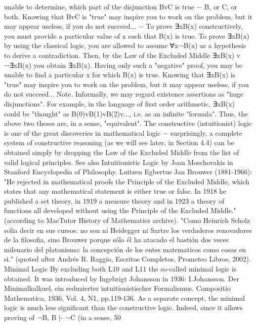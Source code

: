 unable to determine, which part of the disjunction BvC is true − B, or C, or both. Knowing that BvC is
"true" may inspire you to work on the problem, but it may appear useless, if you do not succeed...
− To prove ∃xB(x) constructively, you must provide a particular value of x such that B(x) is true. To
prove ∃xB(x) by using the classical logic, you are allowed to assume ∀x¬B(x) as a hypothesis to derive a
contradiction. Then, by the Law of the Excluded Middle ∃xB(x) v ¬∃xB(x) you obtain ∃xB(x). Having
only such a "negative" proof, you may be unable to find a particular x for which B(x) is true. Knowing
that ∃xB(x) is "true" may inspire you to work on the problem, but it may appear useless, if you do not
succeed...
Note. Informally, we may regard existence assertions as "huge disjunctions". For example, in the
language of first order arithmetic, ∃xB(x) could be "thought" as B(0)vB(1)vB(2)v..., i.e. as an infinite
"formula". Thus, the above two theses are, in a sense, "equivalent".
The constructive (intuitionist) logic is one of the great discoveries in mathematical logic − surprisingly, a
complete system of constructive reasoning (as we will see later, in Section 4.4) can be obtained simply by
dropping the Law of the Excluded Middle from the list of valid logical principles.
See also Intuitionistic Logic by Joan Moschovakis in Stanford Encyclopedia of Philosophy.
Luitzen Egbertus Jan Brouwer (1881-1966): "He rejected in mathematical proofs the Principle of the Excluded Middle, which
states that any mathematical statement is either true or false. In 1918 he published a set theory, in 1919 a measure theory and in
1923 a theory of functions all developed without using the Principle of the Excluded Middle." (according to MacTutor History
of Mathematics archive). "Como Heinrich Scholz solia decir en sus cursos: no son ni Heidegger ni Sartre los verdaderos
renovadores de la filosofia, sino Brouwer porque sólo él ha atacado el bastión dos veces milenario del platonismo: la
concepción de los entes matematicos como cosas en si." (quoted after Andrés R. Raggio, Escritos Completos, Prometeo Libros,
2002).
Minimal Logic
By excluding both L10 and L11 the so-called minimal logic is obtained. It was introduced by Ingebrigt
Johansson in 1936:
I.Johansson. Der Minimalkalkuel, ein reduzierter intuitionistischer Formalismus. Compositio Mathematica, 1936, Vol. 4, N1,
pp.119-136.
As a separate concept, the minimal logic is much less significant than the constructive logic. Indeed, since
it allows proving of ¬B, B |- ¬C (in a sense, 50%
